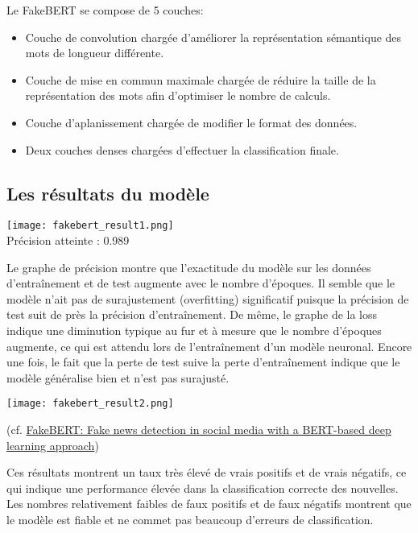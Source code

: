 \documentclass[11pt]{rapport_class}
\begin{document}
Le FakeBERT se compose de 5 couches:
\begin{itemize}
    \item Couche de convolution chargée d’améliorer la représentation sémantique des mots de longueur différente.
    \item Couche de mise en commun maximale chargée de réduire la taille de la représentation des mots afin d’optimiser le nombre de calculs.
    \item Couche d’aplanissement chargée de modifier le format des données.
    \item Deux couches denses chargées d’effectuer la classification finale.
\end{itemize}


\subsection{Les résultats du modèle}
\texttt{[image: fakebert\_result1.png]}\\
Précision atteinte : 0.989

\qquad Le graphe de précision montre que l'exactitude du modèle sur les données d'entraînement et de test augmente avec le nombre d'époques. Il semble que le modèle n'ait pas de surajustement (overfitting) significatif puisque la précision de test suit de près la précision d'entraînement.
De même, le graphe de la loss indique une diminution typique au fur et à mesure que le nombre d'époques augmente, ce qui est attendu lors de l'entraînement d'un modèle neuronal. Encore une fois, le fait que la perte de test suive la perte d'entraînement indique que le modèle généralise bien et n'est pas surajusté.

\begin{center}
    \texttt{[image: fakebert\_result2.png]}\\
    \begin{tiny}
        (cf. \href{https://link.springer.com/article/10.1007/s11042-020-10183-2}{FakeBERT: Fake news detection in social media with a BERT-based deep learning approach})\\
    \end{tiny}
\end{center}

\qquad Ces résultats montrent un taux très élevé de vrais positifs et de vrais négatifs, ce qui indique une performance élevée dans la classification correcte des nouvelles. Les nombres relativement faibles de faux positifs et de faux négatifs montrent que le modèle est fiable et ne commet pas beaucoup d'erreurs de classification.
\end{document}
